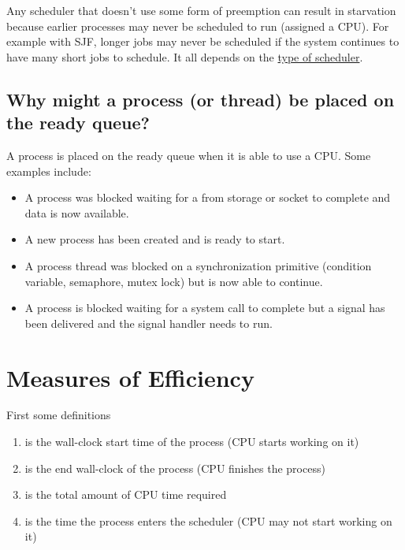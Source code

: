 Any scheduler that doesn't use some form of preemption can result in starvation because earlier processes may never be scheduled to run (assigned a CPU).
For example with SJF, longer jobs may never be scheduled if the system continues to have many short jobs to schedule.
It all depends on the \href{https://en.wikipedia.org/wiki/Scheduling_(computing)\#Types_of_operating_system_schedulers}{type of scheduler}.

\subsection{Why might a process (or thread) be placed on the ready queue?}

A process is placed on the ready queue when it is able to use a CPU. Some examples include:

\begin{itemize}
  \tightlist
\item A process was blocked waiting for a  from storage or socket to complete and data is now available.
\item A new process has been created and is ready to start.
\item A process thread was blocked on a synchronization primitive (condition variable, semaphore, mutex lock) but is now able to continue.
\item A process is blocked waiting for a system call to complete but a signal has been delivered and the signal handler needs to run.
\end{itemize}

\section{Measures of Efficiency}

First some definitions

\begin{enumerate}
  \item {} is the wall-clock start time of the process (CPU starts working on it)
  \item {} is the end wall-clock of the process (CPU finishes the process)
  \item {} is the total amount of CPU time required
  \item {} is the time the process enters the scheduler (CPU may not start working on it)
\end{enumerate}

